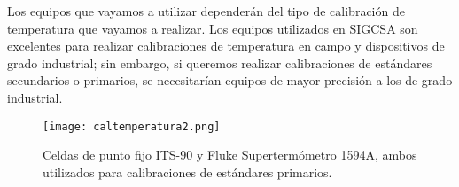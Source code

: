 \par \noindent
Los equipos que vayamos a utilizar dependerán del tipo de calibración de temperatura que vayamos a realizar. Los equipos utilizados en SIGCSA son excelentes para realizar calibraciones de temperatura en campo y dispositivos de grado industrial; sin embargo, si queremos realizar calibraciones de estándares secundarios o primarios, se necesitarían equipos de mayor precisión a los de grado industrial.

\begin{figure}[H]
	\centering
	\texttt{[image: caltemperatura2.png]}
	\caption{Celdas de punto fijo ITS-90 y Fluke Supertermómetro 1594A, ambos utilizados para calibraciones de estándares primarios.}
\end{figure}
